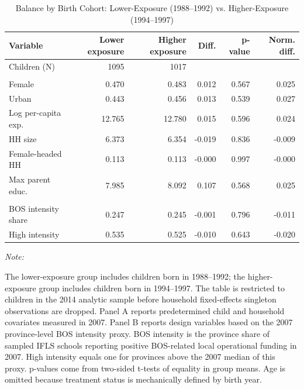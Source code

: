 \begin{table}[!htbp]
\caption{Balance by Birth Cohort: Lower-Exposure (1988--1992) vs. Higher-Exposure (1994--1997)}
\label{tab:balance}
\centering
\vspace{-0.5em}
\begin{threeparttable}
\small
\setlength{\tabcolsep}{3pt}
\renewcommand{\arraystretch}{0.95}
\begin{tabular}[t]{@{}lrrrrr@{}}
\toprule
Variable & Lower exposure & Higher exposure & Diff. & p-value & Norm. diff.\\
\midrule
Children (N) & 1095 & 1017 &  &  & \\
\addlinespace
\multicolumn{6}{l}{\textit{Panel A. Baseline covariates}}\\
Female & 0.470 & 0.483 & 0.012 & 0.567 & 0.025\\
Urban & 0.443 & 0.456 & 0.013 & 0.539 & 0.027\\
Log per-capita exp. & 12.765 & 12.780 & 0.015 & 0.596 & 0.024\\
HH size & 6.373 & 6.354 & -0.019 & 0.836 & -0.009\\
Female-headed HH & 0.113 & 0.113 & -0.000 & 0.997 & -0.000\\
Max parent educ. & 7.985 & 8.092 & 0.107 & 0.568 & 0.025\\
\addlinespace
\multicolumn{6}{l}{\textit{Panel B. Design variables}}\\
BOS intensity share & 0.247 & 0.245 & -0.001 & 0.796 & -0.011\\
High intensity & 0.535 & 0.525 & -0.010 & 0.643 & -0.020\\
\bottomrule
\end{tabular}
\vspace{-0.4em}
\begin{tablenotes}[para]
\item \textit{Note: }
\item The lower-exposure group includes children born in 1988--1992; the higher-exposure group includes children born in 1994--1997. The table is restricted to children in the 2014 analytic sample before household fixed-effects singleton observations are dropped. Panel A reports predetermined child and household covariates measured in 2007. Panel B reports design variables based on the 2007 province-level BOS intensity proxy. BOS intensity is the province share of sampled IFLS schools reporting positive BOS-related local operational funding in 2007. High intensity equals one for provinces above the 2007 median of this proxy. p-values come from two-sided t-tests of equality in group means. Age is omitted because treatment status is mechanically defined by birth year.
\end{tablenotes}
\end{threeparttable}
\end{table}
